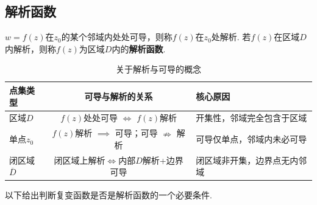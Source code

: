 \documentclass[openany,oneside]{ctexbook}
\begin{document}
\subsection{解析函数}
\begin{definition}
$w=f(z)$在$z_0$的某个邻域内处处可导，则称$f(z)$在$z_0$处解析. 若$f(z)$在区域$D$内解析，则称$f(z)$为区域$D$内的\textbf{解析函数}.
\end{definition}
\begin{table}[h!]
    \centering
    \caption{关于解析与可导的概念}
    \begin{tabular}{lcl} %
    \toprule %
    点集类型 & 可导与解析的关系 & 核心原因 \\
    \midrule %
    区域$D$ & $f(z)$处处可导 $\iff$ $f(z)$解析 & 开集性，邻域完全包含于区域 \\
    单点$z_0$ & $f(z)$解析 $\implies$ 可导；可导 $\nRightarrow$ 解析 & 可导仅单点，邻域内未必可导 \\
    闭区域$\overline{D}$ & 闭区域上解析$\iff$内部$D$解析+边界可导 & 闭区域非开集，边界点无内邻域 \\
    \bottomrule %
  \end{tabular}
\end{table}
以下给出判断复变函数是否是解析函数的一个必要条件.
\end{document}
